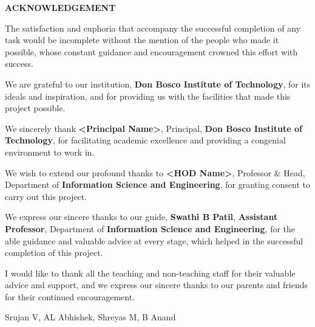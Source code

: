 \documentclass[12pt,a4paper]{report}
\begin{document}
\clearpage

\thispagestyle{empty}
\begin{center}
{\Large \textbf{ACKNOWLEDGEMENT}}
\end{center}
\vspace{10pt}
\noindent
The satisfaction and euphoria that accompany the successful completion of any task would be
incomplete without the mention of the people who made it possible, whose constant guidance and
encouragement crowned this effort with success.

\vspace{8pt}\noindent
We are grateful to our institution, \textbf{Don Bosco Institute of Technology}, for its ideals and inspiration, and for
providing us with the facilities that made this project possible.

\vspace{8pt}\noindent
We sincerely thank \textbf{<Principal Name>}, Principal, \textbf{Don Bosco Institute of Technology}, for facilitating
academic excellence and providing a congenial environment to work in.

\vspace{8pt}\noindent
We wish to extend our profound thanks to \textbf{<HOD Name>}, Professor \& Head, Department of
\textbf{Information Science and Engineering}, for granting consent to carry out this project.

\vspace{8pt}\noindent
We express our sincere thanks to our guide, \textbf{Swathi B Patil}, \textbf{Assistant Professor}, Department
of \textbf{Information Science and Engineering}, for the able guidance and valuable advice at every stage, which helped in
the successful completion of this project.

\vspace{8pt}\noindent
I would like to thank all the teaching and non-teaching staff for their valuable advice and
support, and we express our sincere thanks to our parents and friends for their continued
encouragement.

\vspace{30pt}
\noindent Srujan V, AL Abhishek, Shreyas M, B Anand

\clearpage
\end{document}
